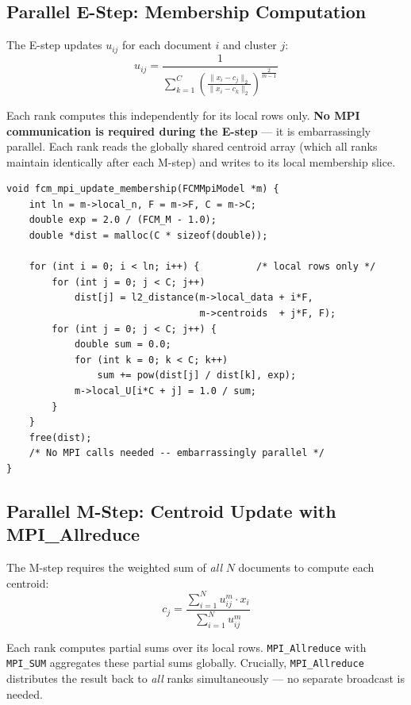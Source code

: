 \documentclass[12pt,a4paper]{article}
\begin{document}
\subsection{Parallel E-Step: Membership Computation}

The E-step updates $u_{ij}$ for each document $i$ and cluster $j$:
\[
u_{ij} = \frac{1}{\displaystyle\sum_{k=1}^{C}
    \left(\frac{\|x_i - c_j\|_2}{\|x_i - c_k\|_2}\right)^{\!\frac{2}{m-1}}}
\]

Each rank computes this independently for its local rows only. \textbf{No MPI communication is required during the E-step} — it is embarrassingly parallel. Each rank reads the globally shared centroid array (which all ranks maintain identically after each M-step) and writes to its local membership slice.

\begin{lstlisting}[style=cstyle, caption={Parallel E-step — each rank processes only its local rows}]
void fcm_mpi_update_membership(FCMMpiModel *m) {
    int ln = m->local_n, F = m->F, C = m->C;
    double exp = 2.0 / (FCM_M - 1.0);
    double *dist = malloc(C * sizeof(double));

    for (int i = 0; i < ln; i++) {          /* local rows only */
        for (int j = 0; j < C; j++)
            dist[j] = l2_distance(m->local_data + i*F,
                                  m->centroids  + j*F, F);
        for (int j = 0; j < C; j++) {
            double sum = 0.0;
            for (int k = 0; k < C; k++)
                sum += pow(dist[j] / dist[k], exp);
            m->local_U[i*C + j] = 1.0 / sum;
        }
    }
    free(dist);
    /* No MPI calls needed -- embarrassingly parallel */
}
\end{lstlisting}

\subsection{Parallel M-Step: Centroid Update with MPI\_Allreduce}

The M-step requires the weighted sum of \emph{all} $N$ documents to compute each centroid:
\[
c_j = \frac{\sum_{i=1}^{N} u_{ij}^m \cdot x_i}{\sum_{i=1}^{N} u_{ij}^m}
\]

Each rank computes partial sums over its local rows. \texttt{MPI\_Allreduce} with \texttt{MPI\_SUM} aggregates these partial sums globally. Crucially, \texttt{MPI\_Allreduce} distributes the result back to \emph{all} ranks simultaneously — no separate broadcast is needed.
\end{document}
